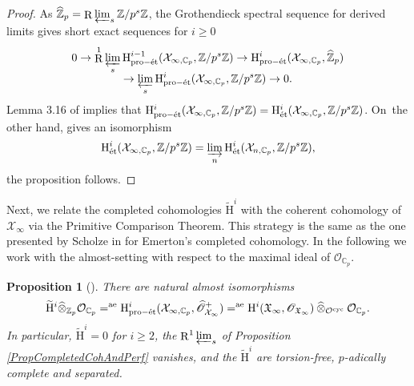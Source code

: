 \documentclass[11pt]{article}
\newcommand{\rae}{\mathrm{ae}}
\newcommand{\cyc}{\mathrm{cyc}}
\newcommand{\et}{\mathrm{\acute{e}t}}
\newcommand{\proet}{\mathrm{pro}\textup{-}\et}
\newcommand{\wotimes}{\mathbin{\widehat\otimes}}
\numberwithin{equation}{section}
\newtheorem{prop}{Proposition}[section]
\theoremstyle{definition}
\newcommand{\bb}[1]{\mathbb{#1}}
\newcommand{\n}[1]{\mathcal{#1}}
\newcommand{\f}[1]{\mathfrak{#1}}
\newcommand{\s}[1]{\mathscr{#1}}
\DeclareMathOperator{\R}{R}
\begin{document}
\begin{proof}
As $\widehat{\bb{Z}}_p = \R \varprojlim_s \bb{Z}/p^s \bb{Z}$, the Grothendieck spectral sequence for derived limits gives short exact sequences for $i\geq 0$\vspace*{-3pt}
\begin{multline*}
0\to \R^1 \varprojlim_s \mathrm{H}^{i-1}_{\proet}(\n{X}_{\infty, \bb{C}_p}, \bb{Z}/p^s \bb{Z}) \to \mathrm{H}^i_{\proet}(\n{X}_{\infty, \bb{C}_p}, \widehat{\bb{Z}}_p)\\[-5pt]
\to \varprojlim_s \mathrm{H}^{i}_{\proet}(\n{X}_{\infty, \bb{C}_p}, \bb{Z}/p^s \bb{Z}) \to 0.
\end{multline*}
Lemma 3.16 of \cite{MR3090230} implies that $\mathrm{H}^{i}_{\proet}(\n{X}_{\infty, \bb{C}_p}, \bb{Z}/p^s \bb{Z}) =\mathrm{H}^{i}_{\et}(\n{X}_{\infty, \bb{C}_p}, \bb{Z}/p^s \bb{Z}) $. On~the other hand, \cite[Cor.\,7.18]{MR3090258} gives an isomorphism
\[
\mathrm{H}_{\et}^i(\n{X}_{\infty, \bb{C}_p}, \bb{Z}/p^s\bb{Z})= \varinjlim_{n} \mathrm{H}_{\et}^i(\n{X}_{n, \bb{C}_p}, \bb{Z}/p^s\bb{Z}),
\]
the proposition follows.
\end{proof}

Next, we relate the completed cohomologies $\widetilde{\mathrm{H}}^i$ with the coherent cohomology of~$\n{X}_{\infty}$ via the Primitive Comparison Theorem. This strategy is the same as the one presented by Scholze in \cite[Ch.\,IV]{scholzeTorsCoho2015} for Emerton's completed cohomology. In the following we work with the almost-setting with respect to the maximal ideal of $\n{O}_{\bb{C}_p}$.

\begin{prop}[{\cite[Th.\,IV.2.1]{scholzeTorsCoho2015}}]
\label{PropCompletedCoherent}
There are natural almost isomorphisms
\begin{equation}
\label{eqIsopcoho}
\widetilde{\mathrm{H}}^i \widehat{\otimes }_{\bb{Z}_p} \n{O}_{\bb{C}_p} =^{\rae} \mathrm{H}^i_{\proet}(\n{X}_{\infty, \bb{C}_p} , \widehat{\s{O}}^+_{\n{X}_{\infty}}) =^{\rae} \mathrm{H}^i(\f{X}_{\infty}, \s{O}_{\f{X}_{\infty}}) \wotimes_{\n{O}^{\cyc}} \n{O}_{\bb{C}_p}.
\end{equation}
In particular, $\widetilde{\mathrm{H}}^i=0$ for $i\geq 2$, the $\R^1 \varprojlim_s$ of Proposition \ref{PropCompletedCohAndPerf} vanishes, and the $\widetilde{\mathrm{H}}^i$ are torsion-free, $p$-adically complete and separated.
\end{prop}
\end{document}
